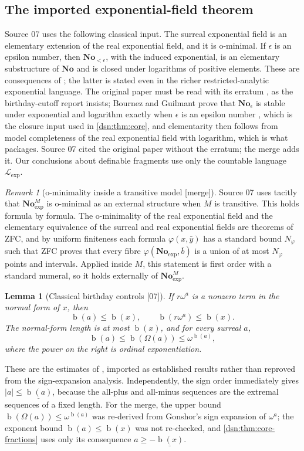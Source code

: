 \documentclass[11pt,a4paper]{article}
\numberwithin{equation}{section}
\newtheorem{lemma}[lemma]{Lemma}
\theoremstyle{definition}
\theoremstyle{remark}
\newtheorem{remark}[remark]{Remark}
\newcommand{\No}{\mathbf{No}}
\newcommand{\bd}{\operatorname{b}}
\newcommand{\Lexp}{\mathcal L_{\exp}}
\newcommand{\src}[1]{\textup{\textsf{\small[#1]}}}
\newcommand{\mergetag}{\textup{\textsf{\small[merge]}}}
\begin{document}
\subsection{The imported exponential-field theorem}\label{dsn:sub:imported}

Source 07 uses the following classical input. The surreal exponential
field is an elementary extension of the real exponential field, and it is
o-minimal. If $\epsilon$ is an epsilon number, then $\No_{<\epsilon}$,
with the induced exponential, is an elementary substructure of $\No$ and
is closed under logarithms of positive elements. These are consequences of
\cite[Theorem 2.1 and Corollary 5.5]{vdDE}; the latter is stated even in
the richer restricted-analytic exponential language. The original paper
must be read with its erratum \cite{vdDEerr}, as the birthday-cutoff report
insists; Bournez and Guilmant prove that $\No_\epsilon$ is stable under
exponential and logarithm exactly when $\epsilon$ is an epsilon number
\cite{BG}, which is the closure input used in \cref{dsn:thm:core}, and
elementarity then follows from model completeness of the real exponential
field with logarithm, which is what \cite[Corollary 5.5]{vdDE} packages.
Source 07 cited the original paper without the erratum; the merge adds it.
Our conclusions about definable fragments use only the countable language
$\Lexp$.

\begin{remark}[o-minimality inside a transitive model \mergetag]
\label{dsn:rem:ominimal}
Source 07 uses tacitly that $\No^M_{\exp}$ is o-minimal as an external
structure when $M$ is transitive. This holds formula by formula. The
o-minimality of the real exponential field and the elementary equivalence
of the surreal and real exponential fields are theorems of ZFC, and by
uniform finiteness each formula $\varphi(x,\bar y)$ has a standard bound
$N_\varphi$ such that ZFC proves that every fibre $\varphi(\No_{\exp},\bar
b)$ is a union of at most $N_\varphi$ points and intervals. Applied inside
$M$, this statement is first order with a standard numeral, so it holds
externally of $\No^M_{\exp}$.
\end{remark}

\begin{lemma}[Classical birthday controls \src{07}]\label{dsn:lem:birthday-controls}
If $r\omega^a$ is a nonzero term in the normal form of $x$, then
\[
 \bd(a)\le\bd(x),\qquad \bd(r\omega^a)\le\bd(x).
\]
The normal-form length is at most $\bd(x)$, and for every surreal $a$,
\[
 \bd(a)\le\bd(\Omega(a))\le\omega^{\bd(a)},
\]
where the power on the right is ordinal exponentiation.
\end{lemma}
These are the estimates of \cite[Lemmas 4.1--4.2 and the proof of
Proposition 4.7]{vdDE}, imported as established results rather than
reproved from the sign-expansion analysis. Independently, the sign order
immediately gives $|a|\le\underline{\bd(a)}$, because the all-plus and
all-minus sequences are the extremal sequences of a fixed length. For the
merge, the upper bound $\bd(\Omega(a))\le\omega^{\bd(a)}$ was re-derived
from Gonshor's sign expansion of $\omega^a$; the exponent bound
$\bd(a)\le\bd(x)$ was not re-checked, and
\cref{dsn:thm:core-fractions} uses only its consequence $a\ge-\underline{\bd(x)}$.
\end{document}
